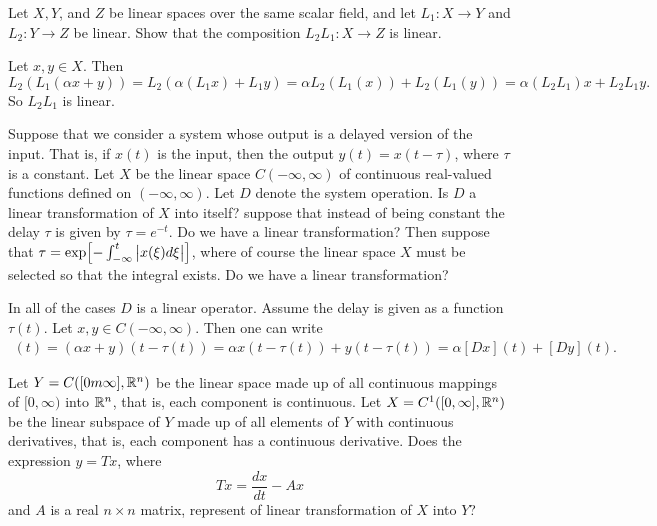 \begin{problem}
	Let $ X,Y $, and $ Z $ be linear spaces over the same scalar field, and let $ L_1:X\to Y $ and $ L_2:Y\to Z $ be linear. Show that the composition $ L_2L_1:X\to Z $ is linear. 
\end{problem}
\begin{solution}
	Let $ x,y\in X $. Then 
	\[ L_2(L_1(\alpha x+y)) = L_2(\alpha(L_1x) + L_1y) = \alpha L_2(L_1(x)) + L_2(L_1(y)) = \alpha (L_2L_1)x + L_2L_1 y.  \]
	So $ L_2L_1 $ is linear.
\end{solution}


\begin{problem}
	Suppose that we consider a system whose output is a delayed version of the input. That is, if $ x(t) $ is the input, then the output $ y(t) = x(t-\tau) $, where $ \tau $ is a constant. Let $ X $ be the linear space $ C(-\infty,\infty) $ of continuous real-valued functions defined on $ (-\infty,\infty) $. Let $ D $ denote the system operation. Is $ D $ a linear transformation of $ X $ into itself? suppose that instead of being constant the delay $ \tau $ is given by $ \tau = e^{-t} $. Do we have a linear transformation? Then suppose that $ \tau = \exp[-\int_{-\infty}^{t}\left|x(\xi)d\xi\right|] $, where of course the linear space $ X $ must be selected so that the integral exists. Do we have a linear transformation?
\end{problem}

\begin{solution}
	In all of the cases $ D $ is a linear operator. Assume the delay is given as a function $ \tau(t) $. Let $ x,y\in C(-\infty,\infty) $. Then one can write
	\begin{align*}
		[D(\alpha x +y)](t) = (\alpha x + y)(t-\tau(t)) = \alpha x(t-\tau(t)) + y(t-\tau(t)) = \alpha [Dx](t) + [Dy](t).
	\end{align*}
\end{solution}



\begin{problem}
	Let $ Y = C([0m\infty],\mathbb{R}^n) $ be the linear space made up of all continuous mappings of $ [0,\infty) $ into $ \mathbb{R}^n $, that is, each component is continuous. Let $ X = C^1([0,\infty],\mathbb{R}^n) $ be the linear subspace of $ Y $ made up of all elements of $ Y $ with continuous derivatives, that is, each component has a continuous derivative. Does the expression $ y = Tx $, where
	\[ Tx = \frac{dx}{dt} - Ax \]
	and $ A $ is a real $ n\times n $ matrix, represent of linear transformation of $ X $ into $ Y $?
\end{problem}

